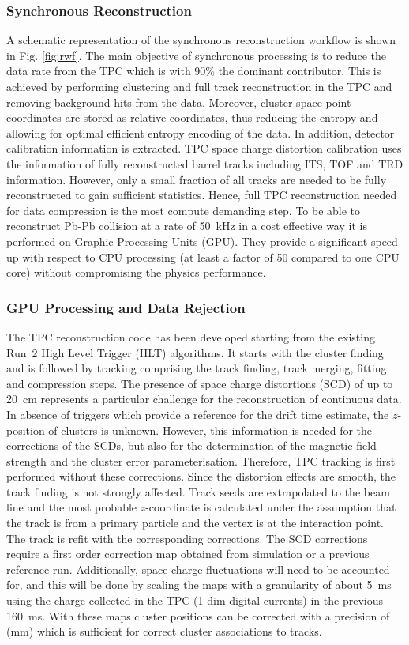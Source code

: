 \subsubsection{Synchronous Reconstruction}
A schematic representation of the synchronous reconstruction workflow is shown in Fig. \ref{fig:rwf}.
The main objective of synchronous processing is to reduce the data rate from the TPC which is with {\color{blue} 90\%}
the dominant contributor. This is achieved by performing clustering and full track reconstruction in the
TPC and removing background hits from the data. Moreover, cluster space point
coordinates are stored as relative coordinates, thus reducing the entropy and allowing for optimal efficient entropy
encoding of the data.
In addition, detector calibration information is extracted. TPC space charge
distortion calibration uses the information of fully reconstructed barrel tracks including ITS, TOF and
TRD information. However, only a small fraction of all tracks are needed to be fully reconstructed to gain
sufficient statistics. Hence, full TPC reconstruction needed for data compression
is the most compute demanding step. To be able to
reconstruct Pb-Pb collision at a rate of 50~kHz in a cost
effective way it is performed on Graphic Processing Units (GPU). They provide a significant speed-up
with respect to CPU processing (at least a factor of 50 compared to one CPU core) without compromising the physics performance.

\subsubsection{GPU Processing and Data Rejection}
The TPC reconstruction code has been developed starting from the existing Run~2 High Level Trigger (HLT) algorithms.
It starts with the cluster finding and is followed by tracking comprising the track
finding, track merging, fitting and compression steps.
The presence of space charge distortions (SCD) of up to 20~cm
represents a particular challenge for the reconstruction of
continuous data. In absence of triggers which provide a reference for the drift time estimate, the $z$-position of clusters
is unknown. However, this information is needed for the corrections of the SCDs, but also for the determination of the magnetic field strength and the cluster error parameterisation.
Therefore, TPC tracking is first performed without these corrections. Since the distortion effects are
smooth, the track finding is not strongly affected. Track seeds are extrapolated to the beam line
and the most probable $z$-coordinate is calculated under the assumption that the track is from a primary particle and the vertex
is at the interaction point.  The track is refit with the corresponding corrections. The SCD corrections require a first order correction map obtained from simulation or a previous reference run.
Additionally, space charge fluctuations will need to be accounted for, and this will be done by scaling the maps with a granularity of about 5~ms using the charge collected in the TPC (1-dim digital currents) in the previous 160~ms. With these maps cluster positions can be corrected with a precision of (mm) which is sufficient for correct cluster associations to tracks.

